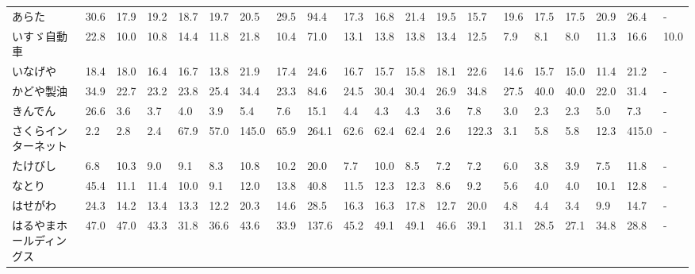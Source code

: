 \begin{longtable}[c]{lp{3mm}p{3mm}p{3mm}p{3mm}p{3mm}p{3mm}p{3mm}p{3mm}p{3mm}p{3mm}p{3mm}p{3mm}p{3mm}p{3mm}p{3mm}p{3mm}p{3mm}p{3mm}p{3mm}}
\bottomrule
\endfoot
\bottomrule
\endlastfoot
あらた             &   30.6 &   17.9 &      19.2 &      18.7 &       19.7 &    20.5 &    29.5 &     94.4 &    17.3 &    16.8 &   21.4 &   19.5 &    15.7 &    19.6 &    17.5 &   17.5 &   20.9 &    26.4 &      - \\
いすゞ自動車          &   22.8 &   10.0 &      10.8 &      14.4 &       11.8 &    21.8 &    10.4 &     71.0 &    13.1 &    13.8 &   13.8 &   13.4 &    12.5 &     7.9 &     8.1 &    8.0 &   11.3 &    16.6 &   10.0 \\
いなげや            &   18.4 &   18.0 &      16.4 &      16.7 &       13.8 &    21.9 &    17.4 &     24.6 &    16.7 &    15.7 &   15.8 &   18.1 &    22.6 &    14.6 &    15.7 &   15.0 &   11.4 &    21.2 &      - \\
かどや製油           &   34.9 &   22.7 &      23.2 &      23.8 &       25.4 &    34.4 &    23.3 &     84.6 &    24.5 &    30.4 &   30.4 &   26.9 &    34.8 &    27.5 &    40.0 &   40.0 &   22.0 &    31.4 &      - \\
きんでん            &   26.6 &    3.6 &       3.7 &       4.0 &        3.9 &     5.4 &     7.6 &     15.1 &     4.4 &     4.3 &    4.3 &    3.6 &     7.8 &     3.0 &     2.3 &    2.3 &    5.0 &     7.3 &      - \\
さくらインターネット      &    2.2 &    2.8 &       2.4 &      67.9 &       57.0 &   145.0 &    65.9 &    264.1 &    62.6 &    62.4 &   62.4 &    2.6 &   122.3 &     3.1 &     5.8 &    5.8 &   12.3 &   415.0 &      - \\
たけびし            &    6.8 &   10.3 &       9.0 &       9.1 &        8.3 &    10.8 &    10.2 &     20.0 &     7.7 &    10.0 &    8.5 &    7.2 &     7.2 &     6.0 &     3.8 &    3.9 &    7.5 &    11.8 &      - \\
なとり             &   45.4 &   11.1 &      11.4 &      10.0 &        9.1 &    12.0 &    13.8 &     40.8 &    11.5 &    12.3 &   12.3 &    8.6 &     9.2 &     5.6 &     4.0 &    4.0 &   10.1 &    12.8 &      - \\
はせがわ            &   24.3 &   14.2 &      13.4 &      13.3 &       12.2 &    20.3 &    14.6 &     28.5 &    16.3 &    16.3 &   17.8 &   12.7 &    20.0 &     4.8 &     4.4 &    3.4 &    9.9 &    14.7 &      - \\
はるやまホールディングス    &   47.0 &   47.0 &      43.3 &      31.8 &       36.6 &    43.6 &    33.9 &    137.6 &    45.2 &    49.1 &   49.1 &   46.6 &    39.1 &    31.1 &    28.5 &   27.1 &   34.8 &    28.8 &      - \\

\end{longtable}

